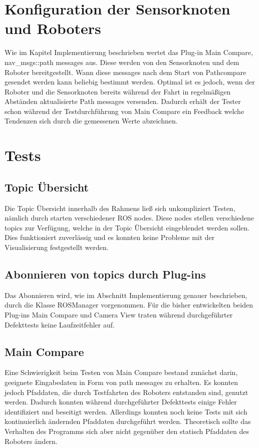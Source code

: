 \section{Konfiguration der Sensorknoten und Roboters}

Wie im Kapitel Implementierung beschrieben wertet das Plug-in Main Compare,
nav\_msgs::path messages aus. Diese werden von den Sensorknoten und dem Roboter
bereitgestellt. Wann diese messages nach dem Start von Pathcompare gesendet
werden kann beliebig bestimmt werden. Optimal ist es jedoch, wenn der Roboter
und die Sensorknoten bereits während der Fahrt in regelmäßigen Abständen
aktualisierte Path messages versenden.  Dadurch erhält der Tester schon
während der Testdurchführung von Main Compare ein Feedback welche Tendenzen
sich durch die gemessenen Werte abzeichnen.

\section{Tests}

\subsection{Topic Übersicht}
Die Topic Übersicht innerhalb des Rahmens ließ sich unkompliziert Testen, nämlich durch
starten verschiedener ROS nodes. Diese nodes stellen verschiedene topics zur
Verfügung, welche in der Topic Übersicht eingeblendet werden sollen. Dies
funktioniert zuverlässig und es konnten keine Probleme mit der Visualisierung
festgestellt werden.

\subsection{Abonnieren von topics durch Plug-ins}
Das Abonnieren wird, wie im Abschnitt Implementierung genauer beschrieben, durch die
Klasse ROSManager vorgenommen. Für die bisher entwickelten beiden Plug-ins Main
Compare und Camera View traten während durchgeführter Defekttests keine
Laufzeitfehler auf.

\subsection{Main Compare}
Eine Schwierigkeit beim Testen von Main Compare bestand zunächst darin,
geeignete Eingabedaten in Form von path messages zu erhalten. Es konnten jedoch
Pfaddaten, die durch Testfahrten des Roboters entstanden sind,
genutzt werden. Dadurch konnten während durchgeführter Defekttests einige Fehler
identifiziert und beseitigt werden. Allerdings konnten noch keine Tests mit sich
kontinuierlich ändernden Pfaddaten durchgeführt werden. Theoretisch sollte das
Verhalten des Programms sich aber nicht gegenüber den statisch Pfaddaten des
Roboters ändern.

